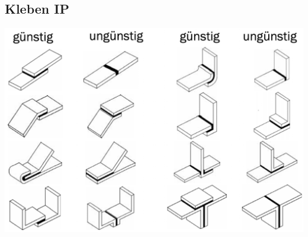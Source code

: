 \subsection{Kleben \hfill IP}
    \begin{footnotesize}
        \begin{center}
            \includegraphics[width = 0.6\linewidth]{src/images/MAEIP_Kleben}
        \end{center}
    \end{footnotesize}